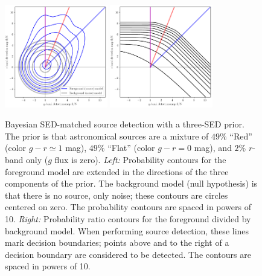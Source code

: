\documentclass[11pt,letterpaper,linenumbers]{aastex63}
\begin{document}
\begin{figure}
    \begin{center}
    \includegraphics[width=0.4\textwidth]{prob-contours-b}
    \includegraphics[width=0.4\textwidth]{prob-rel-b}
    \caption{Bayesian SED-matched source detection with a three-SED prior.
      The prior is that astronomical sources are a
      mixture of $49\%$ ``Red'' (color $g-r \simeq 1$ mag),
      $49\%$ ``Flat'' (color $g - r = 0$ mag),
      and $2\%$ $r$-band only ($g$ flux is zero).
      \emph{Left:} Probability contours for the foreground model are extended in the
      directions of the three components of the prior.
      The background model (null hypothesis) is that there is no source, only noise; these
      contours are circles centered on zero.
      The probability contours are spaced in powers of 10.
      \emph{Right:} Probability ratio contours for the
      foreground divided by background model.
      When performing source detection, these lines mark decision boundaries;
      points above and to the right of a decision boundary are
      considered to be detected.
      The contours are spaced in powers of 10.
      \label{fig:conb}
    }
    \end{center}
\end{figure}
\end{document}
